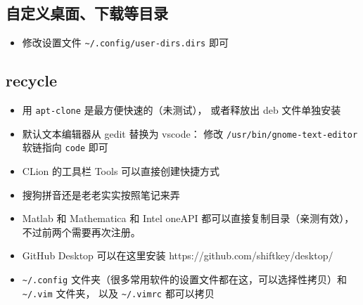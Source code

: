 \subsection{自定义桌面、下载等目录}
\begin{itemize}
\item 修改设置文件 \verb|~/.config/user-dirs.dirs| 即可
\end{itemize}


\subsection{recycle}
\begin{itemize}
\item 用 \verb`apt-clone` 是最方便快速的（未测试）， 或者释放出 deb 文件单独安装
\item 默认文本编辑器从 gedit 替换为 vscode： 修改 \verb`/usr/bin/gnome-text-editor` 软链指向 \verb`code` 即可
\item CLion 的工具栏 Tools 可以直接创建快捷方式
\item 搜狗拼音还是老老实实按照笔记来弄
\item Matlab 和 Mathematica 和 Intel oneAPI 都可以直接复制目录（亲测有效）， 不过前两个需要再次注册。
\item GitHub Desktop 可以在这里安装 https://github.com/shiftkey/desktop/
\item \verb`~/.config` 文件夹（很多常用软件的设置文件都在这，可以选择性拷贝）和 \verb`~/.vim` 文件夹， 以及 \verb`~/.vimrc` 都可以拷贝
\end{itemize}
